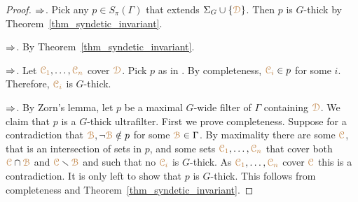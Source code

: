 \begin{proof}
  $\Rightarrow$.
  Pick any $p\in S_\pi(\Gamma)$ that extends $\Sigma_G\cup\{{\color{brown}\EuScript D}\}$.
  Then $p$ is $G$-thick by Theorem~\ref{thm_syndetic_invariant}.

  $\Rightarrow$.
  By Theorem~\ref{thm_syndetic_invariant}.

  $\Rightarrow$.
  Let ${\color{brown}\EuScript C_1},\dots,{\color{brown}\EuScript C_n}$ cover ${\color{brown}\EuScript D}$.
  Pick $p$ as in .
  By completeness, ${\color{brown}\EuScript C_i}\in p$ for some $i$.
  Therefore, ${\color{brown}\EuScript C_i}$ is $G$-thick.

  $\Rightarrow$.
  By Zorn's lemma, let $p$ be a maximal $G$-wide filter of $\Gamma$ containing ${\color{brown}\EuScript D}$.
  We claim that $p$ is a $G$-thick ultrafilter.
  First we prove completeness.
  Suppose for a contradiction that ${\color{brown}\EuScript B},\neg{\color{brown}\EuScript B}\notin p$ for some ${\color{brown}\EuScript B}\in\Gamma$.
  By maximality there are some ${\color{brown}\EuScript C}$, that is an intersection of sets in  $p$, and some sets ${\color{brown}\EuScript C_1},\dots,{\color{brown}\EuScript C_n}$ that cover both ${\color{brown}\EuScript C}\cap{\color{brown}\EuScript B}$ and ${\color{brown}\EuScript C}\smallsetminus{\color{brown}\EuScript B}$ and such that no ${\color{brown}\EuScript C_i}$ is $G$-thick.
  As ${\color{brown}\EuScript C_1},\dots,{\color{brown}\EuScript C_n}$ cover ${\color{brown}\EuScript C}$ this is a contradiction.
  It is only left to show that $p$ is $G$-thick.
  This follows from completeness and Theorem~\ref{thm_syndetic_invariant}.
\end{proof}






